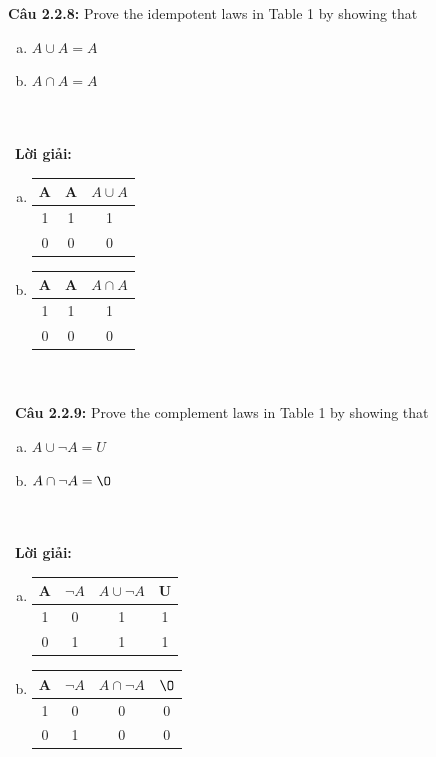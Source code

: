 \documentclass[a4paper]{article}
\begin{document}
\textbf{Câu 2.2.8: }  Prove the idempotent laws in Table 1 by showing that
\begin{enumerate}[a)]
\item $A \cup A = A$
\item $A \cap A = A$
\end{enumerate} \\\ \\\
\textbf{Lời giải:} \begin{enumerate}[a)]
\item \begin{tabular}{|c|c|c|}
\hline 
A & A & $A \cup A$ \\ 
\hline 
1 & 1 & 1 \\ 
\hline 
0 & 0 & 0 \\ 
\hline 
\end{tabular} 
\item \begin{tabular}{|c|c|c|}
\hline 
A & A & $A \cap A$ \\ 
\hline 
1 & 1 & 1 \\ 
\hline 
0 & 0 & 0 \\ 
\hline 
\end{tabular} 
\end{enumerate} \\\ \\\
\textbf{Câu 2.2.9: } Prove the complement laws in Table 1 by showing that
\begin{enumerate}[a)]
\item $A \cup \lnot A = U$
\item $A \cap \lnot A = \O $
\end{enumerate} \\\ \\\
\textbf{Lời giải:} \begin{enumerate}[a)]
\item \begin{tabular}{|c|c|c|c|}
\hline 
A & $\lnot A$ & $A \cup \lnot A$ & U \\ 
\hline 
1 & 0 & 1 & 1 \\ 
\hline 
0 & 1 & 1 & 1 \\ 
\hline 
\end{tabular} 
\item \begin{tabular}{|c|c|c|c|}
\hline 
A & $\lnot A$ & $A \cap \lnot A$ & $\O$ \\ 
\hline 
1 & 0 & 0 & 0 \\ 
\hline 
0 & 1 & 0 & 0 \\ 
\hline 
\end{tabular} 
\end{enumerate} \\\ \\\
\end{document}
